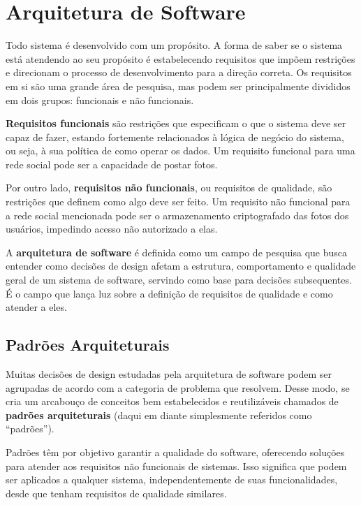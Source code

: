 \chapter{Arquitetura de Software}
\label{chap:arquitetura-software}

Todo sistema é desenvolvido com um propósito. A forma de saber se o sistema está atendendo ao seu propósito é estabelecendo requisitos que impõem restrições e direcionam o processo de desenvolvimento para a direção correta. Os requisitos em si são uma grande área de pesquisa, mas podem ser principalmente divididos em dois grupos: funcionais e não funcionais.

\textbf{Requisitos funcionais} são restrições que especificam o que o sistema deve ser capaz de fazer, estando fortemente relacionados à lógica de negócio do sistema, ou seja, à sua política de como operar os dados. Um requisito funcional para uma rede social pode ser a capacidade de postar fotos. 

Por outro lado, \textbf{requisitos não funcionais}, ou requisitos de qualidade, são restrições que definem como algo deve ser feito. Um requisito não funcional para a rede social mencionada pode ser o armazenamento criptografado das fotos dos usuários, impedindo acesso não autorizado a elas. 

A \textbf{arquitetura de software} é definida como um campo de pesquisa que busca entender como decisões de design afetam a estrutura, comportamento e qualidade geral de um sistema de software, servindo como base para decisões subsequentes. É o campo que lança luz sobre a definição de requisitos de qualidade e como atender a eles. 

\section{Padrões Arquiteturais}

Muitas decisões de design estudadas pela arquitetura de software podem ser agrupadas de acordo com a categoria de problema que resolvem. Desse modo, se cria um arcabouço de conceitos bem estabelecidos e reutilizáveis chamados de \textbf{padrões arquiteturais} (daqui em diante simplesmente referidos como ``padrões'').  

Padrões têm por objetivo garantir a qualidade do software, oferecendo soluções para atender aos requisitos não funcionais de sistemas. Isso significa que podem ser aplicados a qualquer sistema, independentemente de suas funcionalidades, desde que tenham requisitos de qualidade similares.

